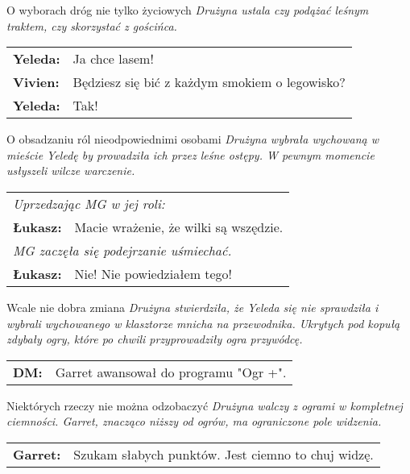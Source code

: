 \documentclass[10pt,twoside,twocolumn]{book}
\begin{document}
\begin{rpg-quotebox}{O wyborach dróg nie tylko życiowych}
   \textit{Drużyna ustala czy podążać leśnym traktem, czy skorzystać z gościńca.}\\
   
   \begin{tabularx}{\columnwidth}{lX}
      \textbf{Yeleda:} & Ja chce lasem!\\
      \textbf{Vivien:} & Będziesz się bić z każdym smokiem o legowisko?\\
      \textbf{Yeleda:} & Tak!\\
   \end{tabularx}
\end{rpg-quotebox}

\begin{rpg-quotebox}{O obsadzaniu ról nieodpowiednimi osobami}
   \textit{Drużyna wybrała wychowaną w mieście Yeledę by prowadziła ich przez leśne ostępy. W pewnym momencie usłyszeli wilcze warczenie.}\\
   
   \begin{tabularx}{\columnwidth}{lX}
      \multicolumn{2}{l}{\textit{Uprzedzając MG w jej roli:}}\\
      \textbf{Łukasz:} & Macie wrażenie, że wilki są wszędzie.\\
      \multicolumn{2}{l}{\textit{MG zaczęła się podejrzanie uśmiechać.}}\\
      \textbf{Łukasz:} & Nie! Nie powiedziałem tego!\\
   \end{tabularx}
\end{rpg-quotebox}

\begin{rpg-quotebox}{Wcale nie dobra zmiana}
   \textit{Drużyna stwierdziła, że Yeleda się nie sprawdziła i wybrali wychowanego w klasztorze mnicha na przewodnika. Ukrytych pod kopułą zdybały ogry, które po chwili przyprowadziły ogra przywódcę.}\\

   \begin{tabularx}{\columnwidth}{lX}
      \textbf{DM:} & Garret awansował do programu "Ogr +".\\
   \end{tabularx}
\end{rpg-quotebox}

\begin{rpg-quotebox}{Niektórych rzeczy nie można odzobaczyć}
   \textit{Drużyna walczy z ogrami w kompletnej ciemności. Garret, znacząco niższy od ogrów, ma ograniczone pole widzenia.}\\

   \begin{tabularx}{\columnwidth}{lX}
      \textbf{Garret:} & Szukam słabych punktów. Jest ciemno to chuj widzę.\\
   \end{tabularx}
\end{rpg-quotebox}
\end{document}
